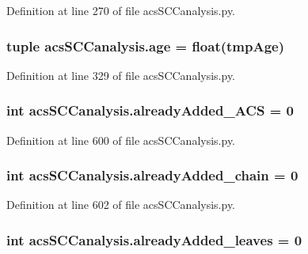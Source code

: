 Definition at line 270 of file acs\-S\-C\-Canalysis.\-py.

\hypertarget{a00102_a98baad82b74a27e8b8c58aa985b7d374}{
\subsubsection[{age}]{\setlength{\rightskip}{0pt plus 5cm}tuple acs\-S\-C\-Canalysis.\-age = float(tmp\-Age)}}\label{a00102_a98baad82b74a27e8b8c58aa985b7d374}


Definition at line 329 of file acs\-S\-C\-Canalysis.\-py.

\hypertarget{a00102_a38f20e6b1cad6a61f1c9b87b37c76f63}{
\subsubsection[{already\-Added\-\_\-\-A\-C\-S}]{\setlength{\rightskip}{0pt plus 5cm}int acs\-S\-C\-Canalysis.\-already\-Added\-\_\-\-A\-C\-S = 0}}\label{a00102_a38f20e6b1cad6a61f1c9b87b37c76f63}


Definition at line 600 of file acs\-S\-C\-Canalysis.\-py.

\hypertarget{a00102_ac1b286545469555eb284f9b5f2bd984f}{
\subsubsection[{already\-Added\-\_\-chain}]{\setlength{\rightskip}{0pt plus 5cm}int acs\-S\-C\-Canalysis.\-already\-Added\-\_\-chain = 0}}\label{a00102_ac1b286545469555eb284f9b5f2bd984f}


Definition at line 602 of file acs\-S\-C\-Canalysis.\-py.

\hypertarget{a00102_ac842390795cf193351c795945cde8e77}{
\subsubsection[{already\-Added\-\_\-leaves}]{\setlength{\rightskip}{0pt plus 5cm}int acs\-S\-C\-Canalysis.\-already\-Added\-\_\-leaves = 0}}\label{a00102_ac842390795cf193351c795945cde8e77}


